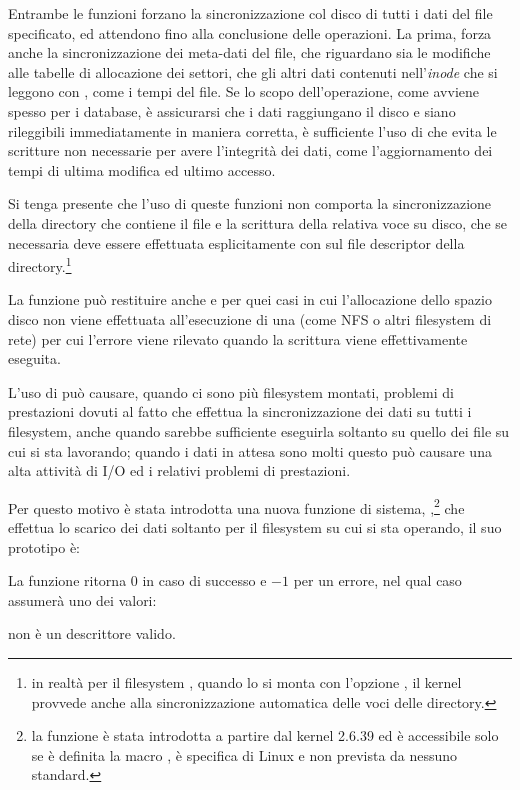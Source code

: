 Entrambe le funzioni forzano la sincronizzazione col disco di tutti i dati del
file specificato, ed attendono fino alla conclusione delle operazioni. La
prima,  forza anche la sincronizzazione dei meta-dati del file,
che riguardano sia le modifiche alle tabelle di allocazione dei settori, che
gli altri dati contenuti nell'\textit{inode} che si leggono con ,
come i tempi del file. Se lo scopo dell'operazione, come avviene spesso per i
database, è assicurarsi che i dati raggiungano il disco e siano rileggibili
immediatamente in maniera corretta, è sufficiente l'uso di 
che evita le scritture non necessarie per avere l'integrità dei dati, come
l'aggiornamento dei tempi di ultima modifica ed ultimo accesso.

Si tenga presente che l'uso di queste funzioni non comporta la
sincronizzazione della directory che contiene il file e la scrittura della
relativa voce su disco, che se necessaria deve essere effettuata
esplicitamente con  sul file descriptor della
directory.\footnote{in realtà per il filesystem , quando lo si monta
  con l'opzione , il kernel provvede anche alla sincronizzazione
  automatica delle voci delle directory.}

La funzione può restituire anche  e  per quei
casi in cui l'allocazione dello spazio disco non viene effettuata
all'esecuzione di una  (come NFS o altri filesystem di rete) per
cui l'errore viene rilevato quando la scrittura viene effettivamente
eseguita.

L'uso di  può causare, quando ci sono più filesystem montati,
problemi di prestazioni dovuti al fatto che effettua la sincronizzazione dei
dati su tutti i filesystem, anche quando sarebbe sufficiente eseguirla
soltanto su quello dei file su cui si sta lavorando; quando i dati in attesa
sono molti questo può causare una alta attività di I/O ed i relativi problemi
di prestazioni.

Per questo motivo è stata introdotta una nuova funzione di sistema,
,\footnote{la funzione è stata introdotta a partire dal kernel
  2.6.39 ed è accessibile solo se è definita la macro , è
  specifica di Linux e non prevista da nessuno standard.} che effettua lo
scarico dei dati soltanto per il filesystem su cui si sta operando, il suo
prototipo è:

\begin{funcproto}{
}

{La funzione ritorna $0$ in caso di successo e $-1$ per un errore, nel qual
  caso  assumerà uno dei valori: 
  \begin{errlist}
    \item[\errcode{EBADF}]  non è un descrittore valido.
  \end{errlist}
}  
\end{funcproto}

